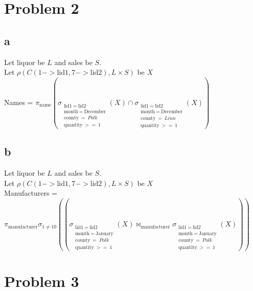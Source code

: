 \documentclass[twoside]{Homework}
\begin{document}
\maketitle

\section*{Problem 2}
\subsection*{a}
Let liquor be $L$ and sales be $S$.\\
\noindent 
Let $\rho(C(1->\textrm{lid1}, 7->\textrm{lid2}), L \times S)$ be $X$\\
\noindent
Names = $\pi_{\textrm{name}}(\sigma_{\substack{\textrm{lid1}\ =\ \textrm{lid2}\\ \textrm{month}\ =\ \textrm{December}\\ \textrm{county}\ =\ {Polk}\\\textrm{quantity}\ >=\ 1}}(X)
\cap 
\sigma_{\substack{\textrm{lid1}\ =\ \textrm{lid2}\\ \textrm{month}\ =\ \textrm{December}\\ \textrm{county}\ =\ {Linn}\\\textrm{quantity}\ >=\ 1}}(X))$

\subsection*{b}
Let liquor be $L$ and sales be $S$.\\
\noindent 
Let $\rho(C(1->\textrm{lid1}, 7->\textrm{lid2}), L \times S)$ be $X$\\
\noindent
Manufacturers = $\pi_{\textrm{manufacturer}}
\sigma_{1 \neq 10}((\sigma_{\substack{\textrm{lid1}\ =\ \textrm{lid2}\\ \textrm{month}\ =\ \textrm{January}\\ \textrm{county}\ =\ {Polk}\\\textrm{quantity}\ >=\ 1}}(X)
\bowtie_{\textrm{manufacturer}}
\sigma_{\substack{\textrm{lid1}\ =\ \textrm{lid2}\\ \textrm{month}\ =\ \textrm{January}\\ \textrm{county}\ =\ {Polk}\\\textrm{quantity}\ >=\ 1}}(X)))$

\section*{Problem 3}
\end{document}
